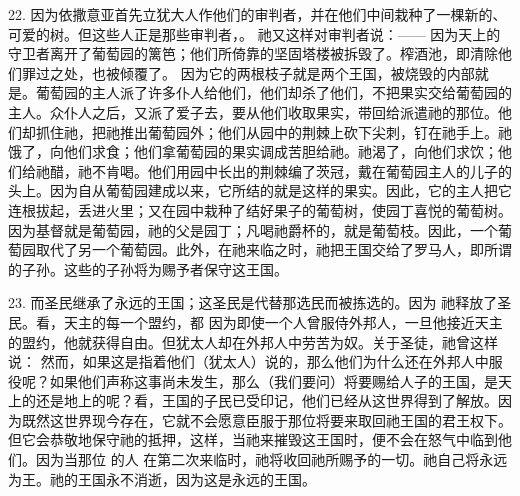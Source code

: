 22. 因为依撒意亚首先立犹大人作他们的审判者，并在他们中间栽种了一棵新的、可爱的树。但这些人正是那些审判者，。 祂又这样对审判者说：—— 因为天上的守卫者离开了葡萄园的篱笆；他们所倚靠的坚固塔楼被拆毁了。榨酒池，即清除他们罪过之处，也被倾覆了。  因为它的两根枝子就是两个王国，被烧毁的内部就是。葡萄园的主人派了许多仆人给他们，他们却杀了他们，不把果实交给葡萄园的主人。众仆人之后，又派了爱子去，要从他们收取果实，带回给派遣祂的那位。他们却抓住祂，把祂推出葡萄园外；他们从园中的荆棘上砍下尖刺，钉在祂手上。祂饿了，向他们求食；他们拿葡萄园的果实调成苦胆给祂。祂渴了，向他们求饮；他们给祂醋，祂不肯喝。他们用园中长出的荆棘编了茨冠，戴在葡萄园主人的儿子的头上。因为自从葡萄园建成以来，它所结的就是这样的果实。因此，它的主人把它连根拔起，丢进火里；又在园中栽种了结好果子的葡萄树，使园丁喜悦的葡萄树。因为基督就是葡萄园，祂的父是园丁；凡喝祂爵杯的，就是葡萄枝。因此，一个葡萄园取代了另一个葡萄园。此外，在祂来临之时，祂把王国交给了罗马人，即所谓的子孙。这些的子孙将为赐予者保守这王国。\par

23. 而圣民继承了永远的王国；这圣民是代替那选民而被拣选的。因为   祂释放了圣民。看，天主的每一个盟约，都   因为即使一个人曾服侍外邦人，一旦他接近天主的盟约，他就获得自由。但犹太人却在外邦人中劳苦为奴。关于圣徒，祂曾这样说：  然而，如果这是指着他们（犹太人）说的，那么他们为什么还在外邦人中服役呢？如果他们声称这事尚未发生，那么（我们要问）将要赐给人子的王国，是天上的还是地上的呢？看，王国的子民已受印记，他们已经从这世界得到了解放。因为既然这世界现今存在，它就不会愿意臣服于那位将要来取回祂王国的君王权下。但它会恭敬地保守祂的抵押，这样，当祂来摧毁这王国时，便不会在怒气中临到他们。因为当那位  的人  在第二次来临时，祂将收回祂所赐予的一切。祂自己将永远为王。祂的王国永不消逝，因为这是永远的王国。\par

